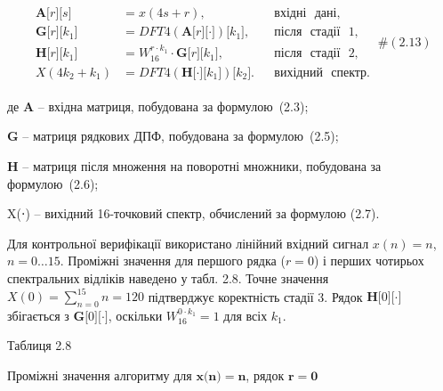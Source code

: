 \documentclass[
]{article}
\begin{document}
\[\begin{array}{r}
\begin{aligned}
\mathbf{A}\lbrack r\rbrack\lbrack s\rbrack & = x(4s + r), & & \text{вхідні}\text{ }\text{дані,} \\
\mathbf{G}\lbrack r\rbrack\lbrack k_{1}\rbrack & = DFT4(\mathbf{A}\lbrack r\rbrack\lbrack \cdot \rbrack)\lbrack k_{1}\rbrack, & & \text{після}\text{ }\text{стадії}\text{ }\text{1,} \\
\mathbf{H}\lbrack r\rbrack\lbrack k_{1}\rbrack & = W_{16}^{r \cdot k_{1}} \cdot \mathbf{G}\lbrack r\rbrack\lbrack k_{1}\rbrack, & & \text{після}\text{ }\text{стадії}\text{ }\text{2,} \\
X(4k_{2} + k_{1}) & = DFT4(\mathbf{H}\lbrack \cdot \rbrack\lbrack k_{1}\rbrack)\lbrack k_{2}\rbrack. & & \text{вихідний}\text{ }\text{спектр.}
\end{aligned}\ \#(2.13)
\end{array}\]

де \(\mathbf{A}\) -- вхідна матриця, побудована за формулою~(2.3);

\(\mathbf{G}\) -- матриця рядкових ДПФ, побудована за формулою~(2.5);

\(\mathbf{H}\) -- матриця після множення на поворотні множники,
побудована за формулою~(2.6);

X(⋅) -- вихідний 16-точковий спектр, обчислений за формулою (2.7).

Для контрольної верифікації використано лінійний вхідний сигнал
\(x(n) = n\), \(n = 0\ldots 15\). Проміжні значення для першого рядка
(\(r = 0\)) і перших чотирьох спектральних відліків наведено у табл.
2.8. Точне значення \(X(0) = \sum_{n = 0}^{15}n = 120\) підтверджує
коректність стадії 3. Рядок
\(\mathbf{H}\lbrack 0\rbrack\lbrack \cdot \rbrack\) збігається з
\(\mathbf{G}\lbrack 0\rbrack\lbrack \cdot \rbrack\), оскільки
\(W_{16}^{0 \cdot k_{1}} = 1\) для всіх \(k_{1}\).

Таблиця 2.8

Проміжні значення алгоритму для
\(\mathbf{x}\mathbf{(}\mathbf{n}\mathbf{) =}\mathbf{n}\), рядок
\(\mathbf{r}\mathbf{=}\mathbf{0}\)
\end{document}
